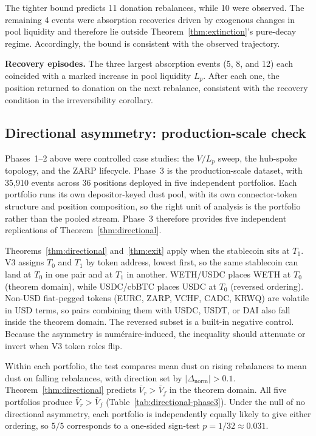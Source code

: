 \documentclass[11pt,a4paper]{article}
\theoremstyle{plain}
\begin{document}
The tighter bound predicts 11 donation rebalances, while 10 were observed. The remaining 4 events were absorption recoveries driven by exogenous changes in pool liquidity and therefore lie outside Theorem~\ref{thm:extinction}'s pure-decay regime. Accordingly, the bound is consistent with the observed trajectory.

\textbf{Recovery episodes.} The three largest absorption events (5, 8, and 12) each coincided with a marked increase in pool liquidity $L_p$. After each one, the position returned to donation on the next rebalance, consistent with the recovery condition in the irreversibility corollary.

\subsection{Directional asymmetry: production-scale check}\label{sec:directional-empirical}

Phases~1--2 above were controlled case studies: the $V/L_p$ sweep, the hub-spoke topology, and the ZARP lifecycle. Phase~3 is the production-scale dataset, with 35{,}910 events across 36 positions deployed in five independent portfolios. Each portfolio runs its own depositor-keyed dust pool, with its own connector-token structure and position composition, so the right unit of analysis is the portfolio rather than the pooled stream. Phase~3 therefore provides five independent replications of Theorem~\ref{thm:directional}.

Theorems~\ref{thm:directional} and~\ref{thm:exit} apply when the stablecoin sits at $T_1$. V3 assigns $T_0$ and $T_1$ by token address, lowest first, so the same stablecoin can land at $T_0$ in one pair and at $T_1$ in another. WETH/USDC places WETH at $T_0$ (theorem domain), while USDC/cbBTC places USDC at $T_0$ (reversed ordering). Non-USD fiat-pegged tokens (EURC, ZARP, VCHF, CADC, KRWQ) are volatile in USD terms, so pairs combining them with USDC, USDT, or DAI also fall inside the theorem domain. The reversed subset is a built-in negative control. Because the asymmetry is numéraire-induced, the inequality should attenuate or invert when V3 token roles flip.

Within each portfolio, the test compares mean dust on rising rebalances to mean dust on falling rebalances, with direction set by $|\Delta_{\mathrm{norm}}| > 0.1$. Theorem~\ref{thm:directional} predicts $\bar V_r > \bar V_f$ in the theorem domain. All five portfolios produce $\bar V_r > \bar V_f$ (Table~\ref{tab:directional-phase3}). Under the null of no directional asymmetry, each portfolio is independently equally likely to give either ordering, so $5/5$ corresponds to a one-sided sign-test $p = 1/32 \approx 0.031$.
\end{document}
